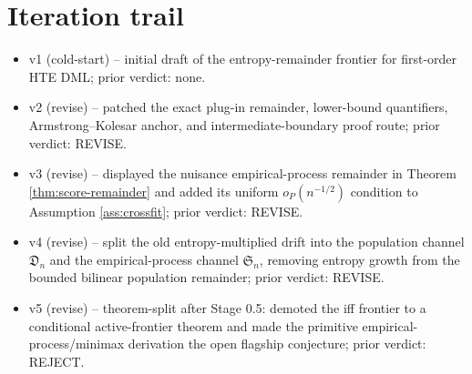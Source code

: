 \documentclass[11pt]{article}
\theoremstyle{definition}
\theoremstyle{plain}
\theoremstyle{remark}
\begin{document}
\section{Iteration trail}
\begin{itemize}[leftmargin=*]
\item v1 (cold-start) -- initial draft of the entropy-remainder frontier for
first-order HTE DML; prior verdict: none.
\item v2 (revise) -- patched the exact plug-in remainder, lower-bound
quantifiers, Armstrong--Kolesar anchor, and intermediate-boundary proof route;
prior verdict: REVISE.
\item v3 (revise) -- displayed the nuisance empirical-process remainder in
Theorem \ref{thm:score-remainder} and added its uniform \(o_P(n^{-1/2})\)
condition to Assumption \ref{ass:crossfit}; prior verdict: REVISE.
\item v4 (revise) -- split the old entropy-multiplied drift into the
population channel \(\mathfrak{D}_n\) and the empirical-process channel
\(\mathfrak{S}_n\), removing entropy growth from the bounded bilinear
population remainder; prior verdict: REVISE.
\item v5 (revise) -- theorem-split after Stage 0.5: demoted the iff frontier
to a conditional active-frontier theorem and made the primitive
empirical-process/minimax derivation the open flagship conjecture; prior
verdict: REJECT.
\end{itemize}
\end{document}
